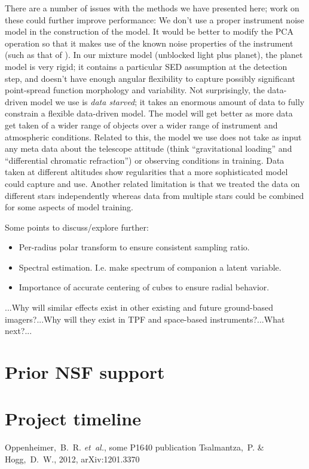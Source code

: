 \documentclass[12pt,pdftex,preprint]{aastex}
\newcommand{\etal}{\textit{et~al.}}
\begin{document}
There are a number of issues with the methods we have presented here;
work on these could further improve performance: We don't use a proper
instrument noise model in the construction of the model.  It would be
better to modify the PCA operation so that it makes use of the known
noise properties of the instrument (such as that of \citealt{hmf}).
In our mixture model (unblocked light plus planet), the planet model
is very rigid; it contains a particular SED assumption at the
detection step, and doesn't have enough angular flexibility to capture
possibly significant point-spread function morphology and variability.
Not surprisingly, the data-driven model we use is \emph{data starved};
it takes an enormous amount of data to fully constrain a flexible
data-driven model.  The model will get better as more data get taken
of a wider range of objects over a wider range of instrument and
atmospheric conditions.  Related to this, the model we use does not
take as input any meta data about the telescope attitude (think
``gravitational loading'' and ``differential chromatic refraction'')
or observing conditions in training.  Data taken at different
altitudes show regularities that a more sophisticated model could
capture and use.  Another related limitation is that we treated the
data on different stars independently whereas data from multiple stars
could be combined for some aspects of model training.



Some points to discuss/explore further:
\begin{itemize}
\item Per-radius polar transform to ensure consistent sampling ratio.
\item Spectral estimation. I.e. make spectrum of companion a latent
  variable.
\item Importance of accurate centering of cubes to ensure radial behavior.
\end{itemize}

...Why will similar effects exist in other existing and future
ground-based imagers?...Why will they exist in TPF and space-based
instruments?...What next?...

\section{Prior NSF support}

\section{Project timeline}

\begin{thebibliography}{}
\bibitem[Oppenheimer \etal(1875)]{p1640}
Oppenheimer,~B.~R. \etal, some P1640 publication
Tsalmantza,~P. \& Hogg,~D.~W., 2012, arXiv:1201.3370
\end{thebibliography}
\end{document}
